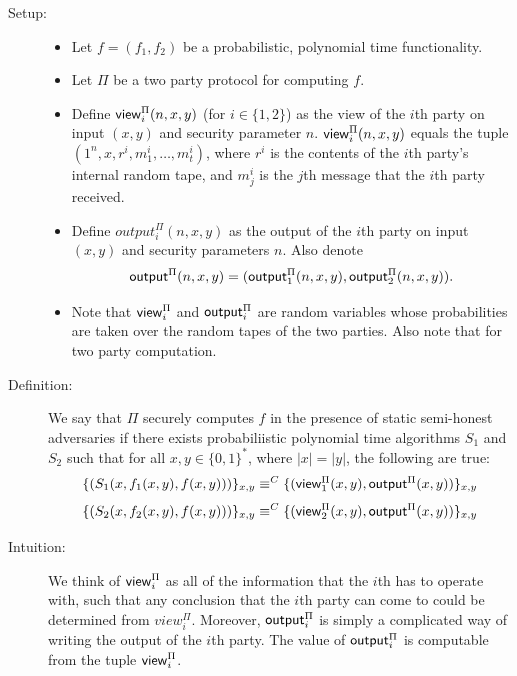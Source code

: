\documentclass[12pt,twoside]{reedthesis}
\newcommand{\outputrv}{{\sf output}}
\newcommand{\viewrv}{{\sf view}}
\begin{document}
\begin{description}
\item [Setup:] \hfill
    \begin{itemize}
        \item Let $f = (f_1, f_2)$ be a probabilistic, polynomial time functionality. 

        \item Let $\Pi$ be a two party protocol for computing $f$. 

        \item Define $\viewrv_i^{\Pi}(n,x,y)$ (for $i \in \{1,2\}$) as the view of the $i$th party on input $(x,y)$ and security parameter $n$.
        $\viewrv_i^{\Pi}(n,x,y)$ equals the tuple $(1^n, x, r^i, m_1^i, \ldots, m_t^i)$, where $r^i$ is the contents of the $i$th party's internal random tape, and $m_j^i$ is the $j$th message that the $i$th party received.
    
        \item Define $output^{\Pi}_i(n,x,y)$ as the output of the $i$th party on input $(x,y)$ and security parameters $n$.
        Also denote
        $$ \outputrv^{\Pi}(n,x,y) = (\outputrv^{\Pi}_1(n,x,y), \outputrv^{\Pi}_2(n,x,y)).$$

    \item Note that $\viewrv^{\Pi}_i$ and $\outputrv^{\Pi}_i$ are random variables whose probabilities are taken over the random tapes of the two parties. Also note that for two party computation.
\end{itemize}
\item [Definition:]
We say that $\Pi$ securely computes $f$ in the presence of static semi-honest adversaries if there exists probabiliistic polynomial time algorithms $S_1$ and $S_2$ such that for all $x,y \in \{0,1\}^*$, where $|x| = |y|$, the following are true:
\begin{equation} 
    \label{eqn:secdef1}
    \{(S_1(x, f_1(x,y), f(x,y)))\}_{x,y} \equiv^C \{(\viewrv^{\Pi}_1(x,y), \outputrv^{\Pi}(x,y)) \}_{x,y} 
\end{equation}
\begin{equation} 
    \label{eqn:secdef2}
    \{(S_2(x, f_2(x,y), f(x,y)))\}_{x,y} \equiv^C \{(\viewrv^{\Pi}_2(x,y), \outputrv^{\Pi}(x,y)) \}_{x,y} 
\end{equation}

\item[Intuition:]
    We think of $\viewrv^{\Pi}_i$ as all of the information that the $i$th has to operate with, such that any conclusion that the $i$th party can come to could be determined from $view^{\Pi}_i$.
    Moreover, $\outputrv^{\Pi}_i$ is simply a complicated way of writing the output of the $i$th party. 
    The value of $\outputrv^{\Pi}_i$ is computable from the tuple $\viewrv^{\Pi}_i$.


\end{description}
\end{document}
